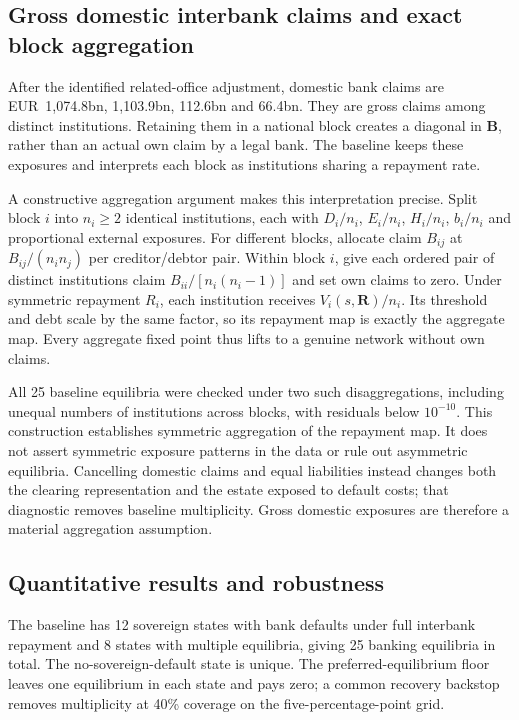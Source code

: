 \subsection{Gross domestic interbank claims and exact block aggregation}

After the identified related-office adjustment, domestic bank claims are EUR~1,074.8bn, 1,103.9bn, 112.6bn and 66.4bn. They are gross claims among distinct institutions. Retaining them in a national block creates a diagonal in $\mathbf{B}$, rather than an actual own claim by a legal bank. The baseline keeps these exposures and interprets each block as institutions sharing a repayment rate.

A constructive aggregation argument makes this interpretation precise. Split block $i$ into $n_i\geq2$ identical institutions, each with $D_i/n_i$, $E_i/n_i$, $H_i/n_i$, $b_i/n_i$ and proportional external exposures. For different blocks, allocate claim $B_{ij}$ at $B_{ij}/(n_in_j)$ per creditor/debtor pair. Within block $i$, give each ordered pair of distinct institutions claim $B_{ii}/[n_i(n_i-1)]$ and set own claims to zero. Under symmetric repayment $R_i$, each institution receives $V_i(s,\mathbf{R})/n_i$. Its threshold and debt scale by the same factor, so its repayment map is exactly the aggregate map. Every aggregate fixed point thus lifts to a genuine network without own claims.

All 25 baseline equilibria were checked under two such disaggregations, including unequal numbers of institutions across blocks, with residuals below $10^{-10}$. This construction establishes symmetric aggregation of the repayment map. It does not assert symmetric exposure patterns in the data or rule out asymmetric equilibria. Cancelling domestic claims and equal liabilities instead changes both the clearing representation and the estate exposed to default costs; that diagnostic removes baseline multiplicity. Gross domestic exposures are therefore a material aggregation assumption.

\subsection{Quantitative results and robustness}

The baseline has 12 sovereign states with bank defaults under full interbank repayment and 8 states with multiple equilibria, giving 25 banking equilibria in total. The no-sovereign-default state is unique. The preferred-equilibrium floor leaves one equilibrium in each state and pays zero; a common recovery backstop removes multiplicity at 40\% coverage on the five-percentage-point grid.

